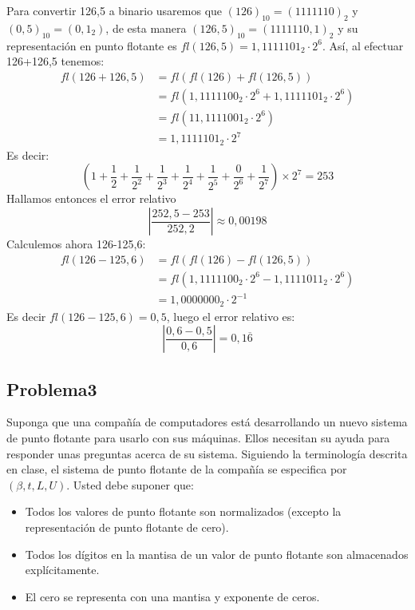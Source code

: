 \documentclass[12pt, a4paper]{article}%
\begin{document}
\begin{itemize}
\begin{solution}
\begin{itemize}
            Para convertir 126,5 a binario usaremos que $(126)_{10}=(1111110)_{2}$ y $(0,5)_{10}=(0,1_{2})$, de esta manera $(126,5)_{10}=(1111110,1)_{2}$ y su representación en punto flotante es $fl(126,5)=1,1111101_{2}\cdot2^6$. Así, al efectuar 126+126,5 tenemos:
            \begin{align*}
                fl(126+126,5)&=fl(fl(126)+fl(126,5))\\
                &=fl(1,1111100_{2}\cdot2^{6}+1,1111101_{2}\cdot2^{6})\\
                &=fl(11,1111001_{2}\cdot2^{6})\\
                &=1,1111101_{2}\cdot2^{7}
            \end{align*}
            Es decir:
            \[
            \left(1+\frac{1}{2}+\frac{1}{2^{2}}+\frac{1}{2^{3}}+\frac{1}{2^{4}}+\frac{1}{2^{5}}+\frac{0}{2^{6}}+\frac{1}{2^{7}}\right)\times2^{7}=253
            \]
            Hallamos entonces el error relativo
            \[
            \left|\frac{252,5-253}{252,2}\right|\approx 0,00198
            \]
            Calculemos ahora 126-125,6:
            \begin{align*}
                fl(126-125,6)&=fl(fl(126)-fl(126,5))\\
                &=fl(1,1111100_{2}\cdot2^{6}-1,1111011_{2}\cdot2^{6})\\
                &=1,0000000_{2}\cdot2^{-1}
            \end{align*}
            Es decir $fl(126-125,6)=0,5$, luego el error relativo es:
            \[
            \left|\frac{0,6-0,5}{0,6}\right|=0,1\overline{6}
            \]
        \end{itemize}
    \end{solution}
\end{itemize}

\subsection*{Problema3}
Suponga que una compañía de computadores está desarrollando un nuevo sistema de punto flotante para usarlo con sus máquinas. Ellos necesitan su ayuda para responder unas preguntas acerca de su sistema. Siguiendo la terminología descrita en clase, el sistema de punto flotante de la compañía se especifica por \( (\beta, t, L, U) \). Usted debe suponer que:

\begin{itemize}
    \item Todos los valores de punto flotante son normalizados (excepto la representación de punto flotante de cero).
    \item Todos los dígitos en la mantisa de un valor de punto flotante son almacenados explícitamente.
    \item El cero se representa con una mantisa y exponente de ceros.
\end{itemize}
\end{document}
